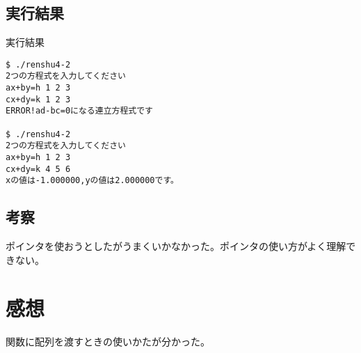 \documentclass[a4j,titlepage]{jarticle}
\begin{document}
\subsection{実行結果}
\begin{itembox}[l]{実行結果}
\begin{verbatim}
$ ./renshu4-2
2つの方程式を入力してください
ax+by=h 1 2 3
cx+dy=k 1 2 3
ERROR!ad-bc=0になる連立方程式です

$ ./renshu4-2
2つの方程式を入力してください
ax+by=h 1 2 3
cx+dy=k 4 5 6
xの値は-1.000000,yの値は2.000000です。
\end{verbatim}
\end{itembox}

\subsection{考察}
ポインタを使おうとしたがうまくいかなかった。ポインタの使い方がよく理解できない。
\section{感想}
関数に配列を渡すときの使いかたが分かった。
\end{document}
